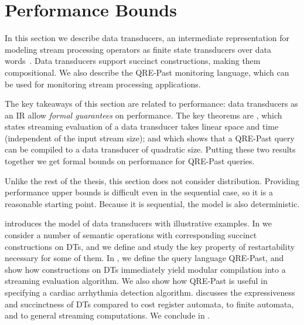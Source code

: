 \chapter{Performance Bounds}
\label{cha:monitoring}


In this section we describe data transducers,
an intermediate representation for modeling
stream processing operators as finite state transducers
over data words~.
Data transducers support succinct constructions, making them
compositional.
We also describe the QRE-Past monitoring language, which
can be used for monitoring stream processing applications.

The key takeaways of this section are related to performance: data transducers
as an IR allow \emph{formal guarantees} on performance.
The key theorems are , which states streaming evaluation of a data transducer takes linear space and time (independent of the input stream size); and  which shows that a QRE-Past query can be compiled to a data transducer of quadratic size.
Putting these two results together we get formal bounds on performance for QRE-Past queries.

Unlike the rest of the thesis, this section does not consider distribution.
Providing performance upper bounds is difficult even in the sequential case, so it is a reasonable starting point.
Because it is sequential, the model is also deterministic.

 introduces the model of data transducers with illustrative examples.
In  we consider a number of semantic operations with
corresponding succinct constructions on DTs, and we define and study the key property of restartability
necessary for some of them.
In , we define the query language QRE-Past, and show how constructions on DTs
immediately yield modular compilation into a streaming evaluation algorithm.
We also show how QRE-Past is useful in specifying a cardiac arrhythmia
detection algorithm. %
 discusses the expressiveness and succinctness of DTs compared to cost register automata, to finite automata, and to general streaming computations.
We conclude in .

